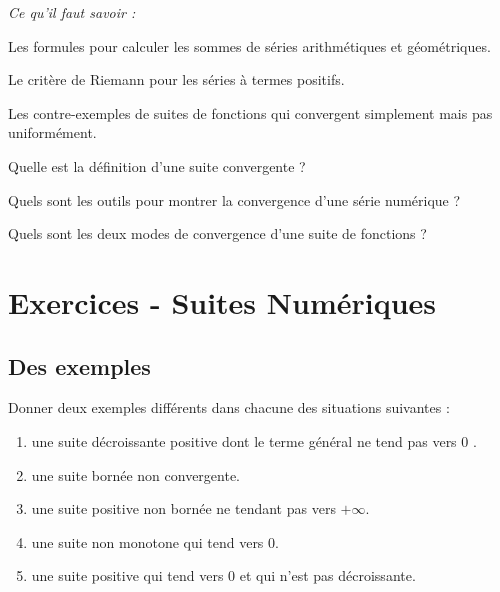 
\begin{resumeBox}
  \emph{Ce qu'il faut savoir :} 
  \begin{niceitemize}
    \item Les formules pour calculer les sommes de séries arithmétiques et géométriques.
    \item Le critère de Riemann pour les séries à termes positifs.
    \item Les contre-exemples de suites de fonctions qui convergent simplement mais pas uniformément. 
  \end{niceitemize}
\end{resumeBox}
\begin{rappelsBox}
  \begin{niceitemize}
    \item Quelle est la définition d'une suite convergente ?
    \item Quels sont les outils pour montrer la convergence d'une série numérique ? 
    \item Quels sont les deux modes de convergence d'une suite de fonctions ?
  \end{niceitemize}
\end{rappelsBox}

\section*{Exercices - Suites Numériques}

\vspace{1em}

\subsection{Des exemples}
Donner deux exemples différents dans chacune des situations suivantes :
\begin{enumerate}[label = $\square$]
  \item une suite décroissante positive dont le terme général ne tend pas vers 0 .
  \item une suite bornée non convergente.
  \item une suite positive non bornée ne tendant pas vers $+\infty$.
  \item une suite non monotone qui tend vers 0.
  \item une suite positive qui tend vers 0 et qui n'est pas décroissante.
\end{enumerate}

